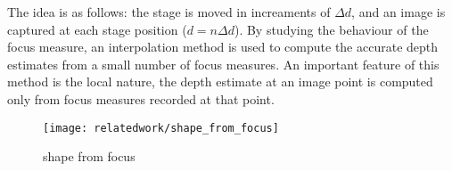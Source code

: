 The idea is as follows: the stage is moved in increaments of $\Delta d$, and an image is captured at each stage position ($d=n\Delta d$). By studying the behaviour of the focus measure, an interpolation method is used to compute the accurate depth estimates from a small number of focus measures. An important feature of this method is the local nature, the depth estimate at an image point is computed only from focus measures recorded at that point.
\begin{figure}[h]
\centering
\texttt{[image: relatedwork/shape\_from\_focus]}
\caption{shape from focus}
\label{fig:shape_from_focus}
\end{figure}
